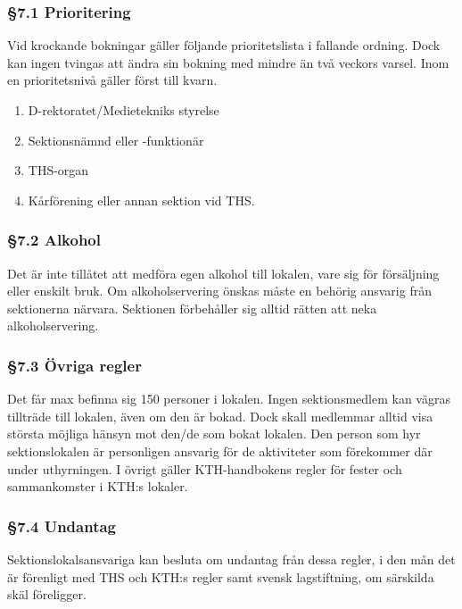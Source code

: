 \subsubsection{§7.1 Prioritering}

Vid krockande bokningar gäller följande prioritetslista i fallande ordning. Dock kan
ingen tvingas att ändra sin bokning med mindre än två veckors varsel. Inom en prioritetsnivå gäller först till kvarn.

\begin{enumerate}
  \item D-rektoratet/Medietekniks styrelse
  \item Sektionsnämnd eller -funktionär
  \item THS-organ
  \item Kårförening eller annan sektion vid THS.
\end{enumerate}

\subsubsection{§7.2 Alkohol}

Det är inte tillåtet att medföra egen alkohol till lokalen, vare sig för försäljning eller enskilt bruk. Om alkoholservering önskas måste en behörig ansvarig från sektionerna närvara. Sektionen förbehåller sig alltid rätten att neka alkoholservering.

\subsubsection{§7.3 Övriga regler}

Det får max befinna sig 150 personer i lokalen. Ingen sektionsmedlem kan
vägras tillträde till lokalen, även om den är bokad. Dock skall medlemmar alltid visa största möjliga hänsyn mot den/de som bokat lokalen. Den person som hyr sektionslokalen är personligen ansvarig för de aktiviteter som förekommer där under uthyrningen. I övrigt gäller KTH-handbokens regler för
fester och sammankomster i KTH:s lokaler.

\subsubsection{§7.4 Undantag}

Sektionslokalsansvariga kan besluta om undantag från dessa regler, i den mån det är förenligt med THS och KTH:s regler samt svensk lagstiftning, om särskilda skäl föreligger.

